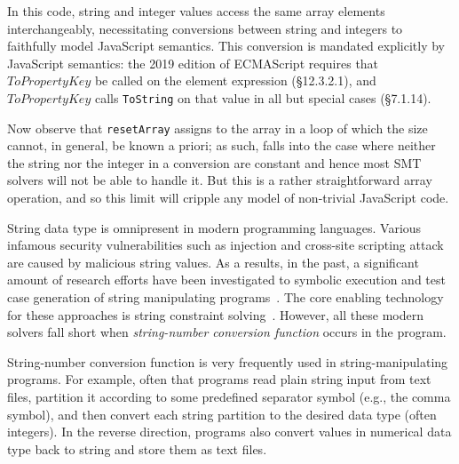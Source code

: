 \documentclass[sigplan,review,anonymous]{acmart}\settopmatter{printfolios=true,printccs=false,printacmref=false}
\begin{document}
In this code, string and integer values access the same array elements interchangeably, necessitating conversions between string and integers to faithfully model JavaScript semantics.  This conversion is mandated explicitly by JavaScript semantics: the 2019 edition of ECMAScript requires that $ToPropertyKey$ be called on the element expression (\S{12.3.2.1}), and $ToPropertyKey$ calls {\tt{ToString}} on that value in all but special cases (\S{7.1.14}).

Now observe that {\tt{resetArray}} assigns to the array in a loop of which the size cannot, in general, be known a priori; as such, falls into the case where neither the string nor the integer in a conversion are constant and hence most SMT solvers will not be able to handle it.  But this is a rather straightforward array operation, and so this limit will cripple any model of non-trivial JavaScript code.





String data type is omnipresent in modern programming languages. Various infamous security vulnerabilities such as injection and cross-site scripting attack are caused by malicious string values. As a results, in the past, a significant amount of research efforts have been investigated to symbolic execution and test case generation of string manipulating programs~\cite{saxena2010symbolic,artzi2011framework,huang2004securing,sen2013jalangi}. The core enabling technology for these approaches is string constraint solving~\cite{kiezun2009hampi,abdulla2014string,zheng2013z3,abdulla2015norn,abdulla2017flatten,wang2016string,abdulla2018trau,chen2019decision,zheng2017z3str2}. However, all these modern solvers fall short when \textit{string-number conversion function} occurs in the program.


String-number conversion function is very frequently used in string-manipulating programs. For example, often that programs read plain string input from text files, partition it according to some predefined separator symbol (e.g., the comma symbol), and then convert each string partition to the desired data type (often integers). In the reverse direction, programs also convert values in numerical data type back to string and store them as text files. 
\end{document}
